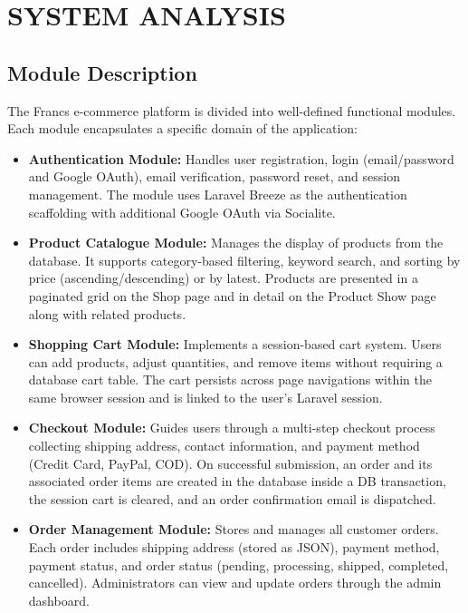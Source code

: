 \chapter{SYSTEM ANALYSIS}

\section{Module Description}
The Francs e-commerce platform is divided into well-defined functional modules. Each module encapsulates a specific domain of the application:

\begin{itemize}
    \item \textbf{Authentication Module:} Handles user registration, login (email/password and Google OAuth), email verification, password reset, and session management. The module uses Laravel Breeze as the authentication scaffolding with additional Google OAuth via Socialite.

    \item \textbf{Product Catalogue Module:} Manages the display of products from the database. It supports category-based filtering, keyword search, and sorting by price (ascending/descending) or by latest. Products are presented in a paginated grid on the Shop page and in detail on the Product Show page along with related products.

    \item \textbf{Shopping Cart Module:} Implements a session-based cart system. Users can add products, adjust quantities, and remove items without requiring a database cart table. The cart persists across page navigations within the same browser session and is linked to the user's Laravel session.

    \item \textbf{Checkout Module:} Guides users through a multi-step checkout process collecting shipping address, contact information, and payment method (Credit Card, PayPal, COD). On successful submission, an order and its associated order items are created in the database inside a DB transaction, the session cart is cleared, and an order confirmation email is dispatched.

    \item \textbf{Order Management Module:} Stores and manages all customer orders. Each order includes shipping address (stored as JSON), payment method, payment status, and order status (pending, processing, shipped, completed, cancelled). Administrators can view and update orders through the admin dashboard.


\end{itemize}
